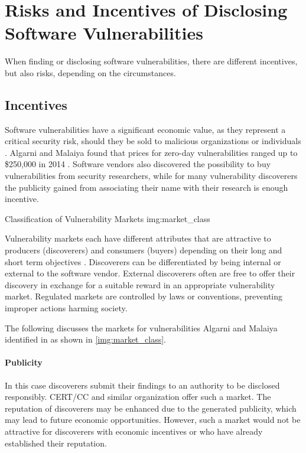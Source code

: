 \section{Risks and Incentives of Disclosing Software Vulnerabilities}
\label{sec:risks_incentives}

When finding or disclosing software vulnerabilities, there are different incentives, but also risks, depending on the circumstances.

\subsection{Incentives}
Software vulnerabilities have a significant economic value, as they represent
a critical security risk, should they be sold to malicious organizations or
individuals \cite{Algarni2014}. 
Algarni and Malaiya found that prices for zero-day
vulnerabilities ranged up to \$250,000 in 2014 \cite{Algarni2014}. 
Software vendors also discovered the possibility to buy vulnerabilities from 
security researchers, while for many vulnerability discoverers the publicity 
gained from associating their name with their research is enough incentive.

        {Classification of Vulnerability Markets \cite{Algarni2014}}
        {img:market_class}

Vulnerability markets each have different attributes that are attractive to
producers (discoverers) and consumers (buyers) depending on their long and short
term objectives \cite{Algarni2014}.
Discoverers can be differentiated by being internal or external to the software
vendor.
External discoverers often are free to offer their discovery in exchange for a
suitable reward in an appropriate vulnerability market.
Regulated markets are controlled by laws or conventions, preventing improper
actions harming society.

The following discusses the markets for vulnerabilities Algarni and Malaiya 
identified in \cite{Algarni2014} as shown in \autoref{img:market_class}.

\paragraph{Publicity}

In this case discoverers submit their findings to an authority to be disclosed 
responsibly.
CERT/CC and similar organization offer such a market. 
The reputation of discoverers may be enhanced due to the generated publicity, 
which may lead to future economic opportunities.
However, such a market would not be attractive for discoverers with economic
incentives or who have already established their reputation.

